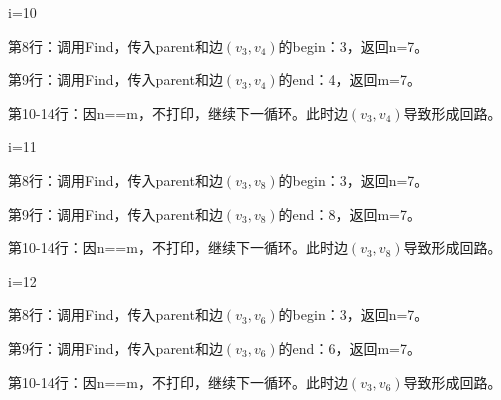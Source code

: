 \begin{frame}\ft{\subsubsecname}
\begin{figure}

\end{figure}
\end{frame}


\begin{frame}[fragile]\ft{\subsubsecname}
\tf i=10
\vspace{0.05in}

第8行：调用Find，传入parent和边$(v_3,v_4)$的begin：3，返回n=7。 \vspace{0.05in}

第9行：调用Find，传入parent和边$(v_3,v_4)$的end：4，返回m=7。 \vspace{0.05in}

第10-14行：因n==m，不打印，继续下一循环。此时边$(v_3,v_4)$导致形成回路。
\end{frame}

\begin{frame}[fragile]\ft{\subsubsecname}
\tf i=11
\vspace{0.05in}

第8行：调用Find，传入parent和边$(v_3,v_8)$的begin：3，返回n=7。 \vspace{0.05in}

第9行：调用Find，传入parent和边$(v_3,v_8)$的end：8，返回m=7。 \vspace{0.05in}

第10-14行：因n==m，不打印，继续下一循环。此时边$(v_3,v_8)$导致形成回路。
\end{frame}


\begin{frame}[fragile]\ft{\subsubsecname}
\tf i=12
\vspace{0.05in}

第8行：调用Find，传入parent和边$(v_3,v_6)$的begin：3，返回n=7。 \vspace{0.05in}

第9行：调用Find，传入parent和边$(v_3,v_6)$的end：6，返回m=7。 \vspace{0.05in}

第10-14行：因n==m，不打印，继续下一循环。此时边$(v_3,v_6)$导致形成回路。
\end{frame}




